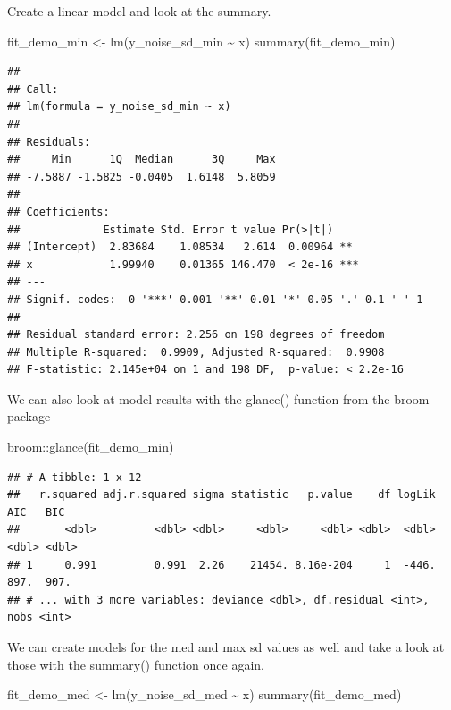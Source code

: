 \documentclass[
]{book}
\newenvironment{Shaded}{\begin{snugshade}}{\end{snugshade}}
\newcommand{\FunctionTok}[1]{\textcolor[rgb]{0.00,0.00,0.00}{#1}}
\newcommand{\NormalTok}[1]{#1}
\newcommand{\OtherTok}[1]{\textcolor[rgb]{0.56,0.35,0.01}{#1}}
\newcommand{\SpecialCharTok}[1]{\textcolor[rgb]{0.00,0.00,0.00}{#1}}
\begin{document}
Create a linear model and look at the summary.

\begin{Shaded}
\begin{Highlighting}[]
\NormalTok{fit\_demo\_min }\OtherTok{\textless{}{-}} \FunctionTok{lm}\NormalTok{(y\_noise\_sd\_min }\SpecialCharTok{\textasciitilde{}}\NormalTok{ x)}
\FunctionTok{summary}\NormalTok{(fit\_demo\_min)}
\end{Highlighting}
\end{Shaded}

\begin{verbatim}
## 
## Call:
## lm(formula = y_noise_sd_min ~ x)
## 
## Residuals:
##     Min      1Q  Median      3Q     Max 
## -7.5887 -1.5825 -0.0405  1.6148  5.8059 
## 
## Coefficients:
##             Estimate Std. Error t value Pr(>|t|)    
## (Intercept)  2.83684    1.08534   2.614  0.00964 ** 
## x            1.99940    0.01365 146.470  < 2e-16 ***
## ---
## Signif. codes:  0 '***' 0.001 '**' 0.01 '*' 0.05 '.' 0.1 ' ' 1
## 
## Residual standard error: 2.256 on 198 degrees of freedom
## Multiple R-squared:  0.9909, Adjusted R-squared:  0.9908 
## F-statistic: 2.145e+04 on 1 and 198 DF,  p-value: < 2.2e-16
\end{verbatim}

We can also look at model results with the glance() function from the broom package

\begin{Shaded}
\begin{Highlighting}[]
\NormalTok{broom}\SpecialCharTok{::}\FunctionTok{glance}\NormalTok{(fit\_demo\_min)}
\end{Highlighting}
\end{Shaded}

\begin{verbatim}
## # A tibble: 1 x 12
##   r.squared adj.r.squared sigma statistic   p.value    df logLik   AIC   BIC
##       <dbl>         <dbl> <dbl>     <dbl>     <dbl> <dbl>  <dbl> <dbl> <dbl>
## 1     0.991         0.991  2.26    21454. 8.16e-204     1  -446.  897.  907.
## # ... with 3 more variables: deviance <dbl>, df.residual <int>, nobs <int>
\end{verbatim}

We can create models for the med and max sd values as well and take a look at those with the summary() function once again.

\begin{Shaded}
\begin{Highlighting}[]
\NormalTok{fit\_demo\_med }\OtherTok{\textless{}{-}} \FunctionTok{lm}\NormalTok{(y\_noise\_sd\_med }\SpecialCharTok{\textasciitilde{}}\NormalTok{ x)}
\FunctionTok{summary}\NormalTok{(fit\_demo\_med)}
\end{Highlighting}
\end{Shaded}
\end{document}

